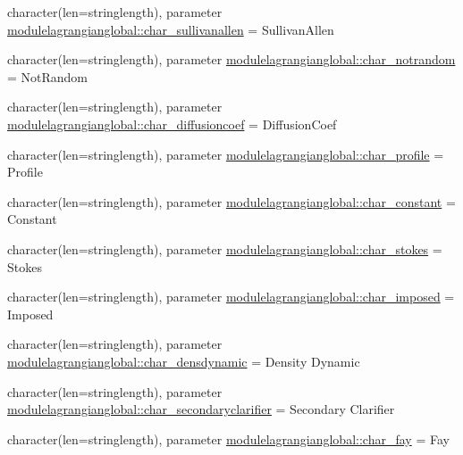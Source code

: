 \begin{DoxyCompactItemize}
\item 
character(len=stringlength), parameter \mbox{\hyperlink{namespacemodulelagrangianglobal_afdb4743d7d08dfaf8d2d30c1134e67a8}{modulelagrangianglobal\+::char\+\_\+sullivanallen}} = \textquotesingle{}Sullivan\+Allen\textquotesingle{}
\item 
character(len=stringlength), parameter \mbox{\hyperlink{namespacemodulelagrangianglobal_a103224e1750898a205c52c118e2928c4}{modulelagrangianglobal\+::char\+\_\+notrandom}} = \textquotesingle{}Not\+Random\textquotesingle{}
\item 
character(len=stringlength), parameter \mbox{\hyperlink{namespacemodulelagrangianglobal_a234c61a0915a1f75b69e303d31db4682}{modulelagrangianglobal\+::char\+\_\+diffusioncoef}} = \textquotesingle{}Diffusion\+Coef\textquotesingle{}
\item 
character(len=stringlength), parameter \mbox{\hyperlink{namespacemodulelagrangianglobal_af6ac559e88380d9fe75440e8f1cf4391}{modulelagrangianglobal\+::char\+\_\+profile}} = \textquotesingle{}Profile\textquotesingle{}
\item 
character(len=stringlength), parameter \mbox{\hyperlink{namespacemodulelagrangianglobal_aa34f822cfd80683c0cbdc706bdc274de}{modulelagrangianglobal\+::char\+\_\+constant}} = \textquotesingle{}Constant\textquotesingle{}
\item 
character(len=stringlength), parameter \mbox{\hyperlink{namespacemodulelagrangianglobal_a2e9f96bca2079870ccfeefc126adbdc7}{modulelagrangianglobal\+::char\+\_\+stokes}} = \textquotesingle{}Stokes\textquotesingle{}
\item 
character(len=stringlength), parameter \mbox{\hyperlink{namespacemodulelagrangianglobal_a071c642bc3b600b7de0906c055ca05fa}{modulelagrangianglobal\+::char\+\_\+imposed}} = \textquotesingle{}Imposed\textquotesingle{}
\item 
character(len=stringlength), parameter \mbox{\hyperlink{namespacemodulelagrangianglobal_ab06fbdfc40ff183a187287310869ec5a}{modulelagrangianglobal\+::char\+\_\+densdynamic}} = \textquotesingle{}Density Dynamic\textquotesingle{}
\item 
character(len=stringlength), parameter \mbox{\hyperlink{namespacemodulelagrangianglobal_aa3c5e2185217680ddbc27f6426874d57}{modulelagrangianglobal\+::char\+\_\+secondaryclarifier}} = \textquotesingle{}Secondary Clarifier\textquotesingle{}
\item 
character(len=stringlength), parameter \mbox{\hyperlink{namespacemodulelagrangianglobal_a028d5f752e52b4a1faebf81afd4d5e27}{modulelagrangianglobal\+::char\+\_\+fay}} = \textquotesingle{}Fay\textquotesingle{}

\end{DoxyCompactItemize}
